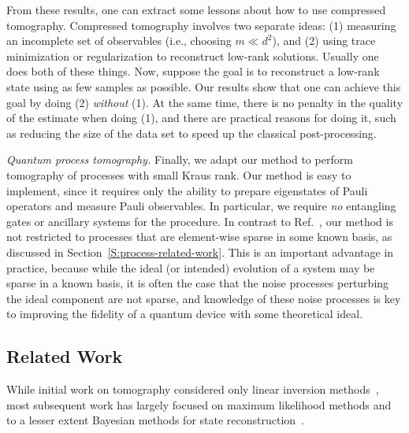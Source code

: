 From these results, one can extract some lessons about how to use compressed tomography.  Compressed tomography involves two separate ideas: (1) measuring an incomplete set of observables (i.e., choosing $m \ll d^2$), and (2) using trace minimization or regularization to reconstruct low-rank solutions. Usually one does both of these things. Now, suppose the goal is to reconstruct a low-rank state using as few samples as possible. Our results show that one can achieve this goal by doing (2) \textit{without} (1). At the same time, there is no penalty in the quality of the estimate when doing (1), and there are practical reasons for doing it, such as reducing the size of the data set to speed up the classical post-processing.

\textit{Quantum process tomography.} Finally, we adapt our method to perform tomography of processes with small Kraus rank.  Our method is easy to implement, since it requires only the ability to prepare eigenstates of Pauli operators and measure Pauli observables. In particular, we require \emph{no} entangling gates or ancillary systems for the procedure. In contrast to Ref.~\cite{Shabani2011}, our method is not restricted to processes that are element-wise sparse in some known basis, as discussed in Section~\ref{S:process-related-work}. This is an important advantage in practice, because while the ideal (or intended) evolution of a system may be sparse in a known basis, it is often the case that the noise processes perturbing the ideal component are not sparse, and knowledge of these noise processes is key to improving the fidelity of a quantum device with some theoretical ideal.


\subsection{Related Work}


While initial work on tomography considered only linear inversion methods~\cite{Vogel1989}, most subsequent work has largely focused on maximum likelihood methods and to a lesser extent Bayesian methods for state reconstruction~\cite{Jones1991, Hradil1997, Buzek1998, Banaszek1999, Gill2000, Schack2001, James2001, Jezek2003, Neri2005, Tanaka2005, Bagan2006, Audenaert2009, Nunn2010, Blume-Kohout2010a, Vogel1989}.

